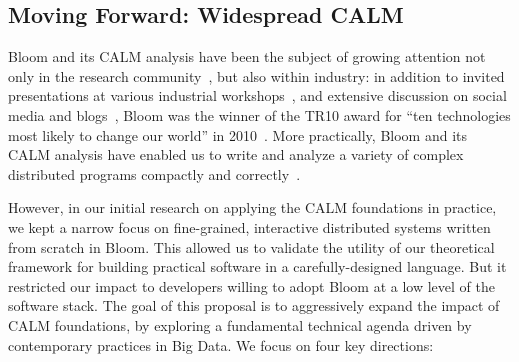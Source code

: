 \subsection{Moving Forward: Widespread CALM}
Bloom and its CALM analysis have been the subject of growing attention not only in the research community~\cite{Ameloot2011,Ameloot2012,Abiteboul2011,Green2011}, but also within industry: in addition to invited presentations at various industrial workshops~\cite{goto11,langnext12,basho12}, and extensive discussion on social media and blogs~\cite{}, Bloom was the winner of the TR10 award for ``ten technologies most likely to change our world'' in 2010~\cite{tr10}.  More practically, Bloom and its CALM analysis have enabled us to write and analyze a variety of complex distributed programs compactly and correctly~\cite{bud-sandbox}.  

However, in our initial research on applying the CALM foundations in practice, we kept a narrow focus on fine-grained, interactive distributed systems written from scratch in Bloom.  This allowed us to validate the utility of our theoretical framework for building practical software in a carefully-designed language.  But it restricted our impact to developers willing to adopt Bloom at a low level of the software stack.  The goal of this proposal is to aggressively expand the impact of CALM foundations, by exploring a fundamental technical agenda driven by contemporary practices in Big Data.  We focus on four key directions:


